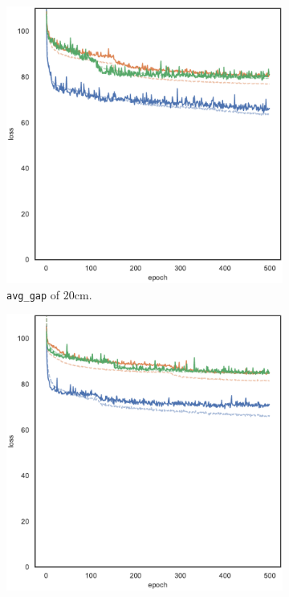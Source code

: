 \begin{figure}[!htb]
\begin{center}
\begin{subfigure}[h]{0.32\textwidth}
			\includegraphics[width=\textwidth]{contents/images/task1-comm-extension/loss-communication-gap_20@copy}%
			\caption{\texttt{avg\_gap} of $20$\gls{cm}.}
		\end{subfigure}
		\hfill
		\begin{subfigure}[h]{0.32\textwidth}
			\includegraphics[width=\textwidth]{contents/images/task1-comm-extension/loss-communication-gap_var@copy}

\end{subfigure}
\end{center}
\end{figure}
